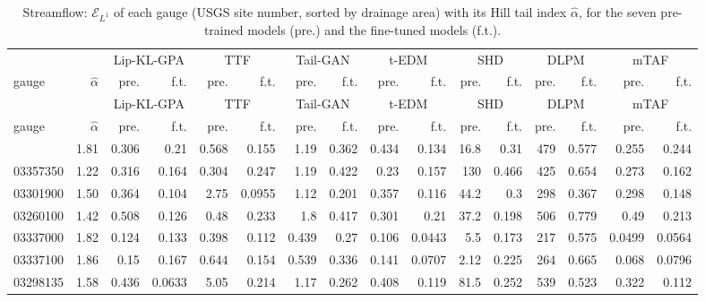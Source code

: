 \begin{longtable}{l r rr rr rr rr rr rr rr}
\caption{Streamflow: $\mathcal{E}_{L^1}$ of each gauge (USGS site number, sorted by drainage area) with its Hill tail index $\hat\alpha$, for the seven pre-trained models (pre.) and the fine-tuned models (f.t.).}\label{tab:sf_l1}\\ \toprule
 & & \multicolumn{2}{c}{Lip-KL-GPA} & \multicolumn{2}{c}{TTF} & \multicolumn{2}{c}{Tail-GAN} & \multicolumn{2}{c}{t-EDM} & \multicolumn{2}{c}{SHD} & \multicolumn{2}{c}{DLPM} & \multicolumn{2}{c}{mTAF}\\
\cmidrule(lr){3-4} \cmidrule(lr){5-6} \cmidrule(lr){7-8} \cmidrule(lr){9-10} \cmidrule(lr){11-12} \cmidrule(lr){13-14} \cmidrule(lr){15-16}
gauge & $\hat\alpha$ & pre. & f.t. & pre. & f.t. & pre. & f.t. & pre. & f.t. & pre. & f.t. & pre. & f.t. & pre. & f.t.\\ \midrule \endfirsthead
\toprule  & & \multicolumn{2}{c}{Lip-KL-GPA} & \multicolumn{2}{c}{TTF} & \multicolumn{2}{c}{Tail-GAN} & \multicolumn{2}{c}{t-EDM} & \multicolumn{2}{c}{SHD} & \multicolumn{2}{c}{DLPM} & \multicolumn{2}{c}{mTAF}\\
\cmidrule(lr){3-4} \cmidrule(lr){5-6} \cmidrule(lr){7-8} \cmidrule(lr){9-10} \cmidrule(lr){11-12} \cmidrule(lr){13-14} \cmidrule(lr){15-16}
gauge & $\hat\alpha$ & pre. & f.t. & pre. & f.t. & pre. & f.t. & pre. & f.t. & pre. & f.t. & pre. & f.t. & pre. & f.t.\\ \midrule \endhead \bottomrule \endfoot
03284525 & 1.81 & 0.306 & {0.21} & 0.568 & {0.155} & 1.19 & {0.362} & 0.434 & {0.134} & 16.8 & {0.31} & 479 & {0.577} & 0.255 & {0.244}\\
03357350 & 1.22 & 0.316 & {0.164} & 0.304 & {0.247} & 1.19 & {0.422} & 0.23 & {0.157} & 130 & {0.466} & 425 & {0.654} & 0.273 & {0.162}\\
03301900 & 1.50 & 0.364 & {0.104} & 2.75 & {0.0955} & 1.12 & {0.201} & 0.357 & {0.116} & 44.2 & {0.3} & 298 & {0.367} & 0.298 & {0.148}\\
03260100 & 1.42 & 0.508 & {0.126} & 0.48 & {0.233} & 1.8 & {0.417} & 0.301 & {0.21} & 37.2 & {0.198} & 506 & {0.779} & 0.49 & {0.213}\\
03337000 & 1.82 & 0.124 & 0.133 & 0.398 & {0.112} & 0.439 & {0.27} & 0.106 & {0.0443} & 5.5 & {0.173} & 217 & {0.575} & 0.0499 & 0.0564\\
03337100 & 1.86 & 0.15 & 0.167 & 0.644 & {0.154} & 0.539 & {0.336} & 0.141 & {0.0707} & 2.12 & {0.225} & 264 & {0.665} & 0.068 & 0.0796\\
03298135 & 1.58 & 0.436 & {0.0633} & 5.05 & {0.214} & 1.17 & {0.262} & 0.408 & {0.119} & 81.5 & {0.252} & 539 & {0.523} & 0.322 & {0.112}\\

\end{longtable}
